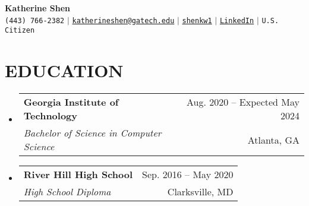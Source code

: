\documentclass[letterpaper,12pt]{extarticle}
\makeatletter
\newcommand{\resumeSubheading}[4]{
  \vspace{-1pt}\item
    \begin{tabular*}{\textwidth}[t]{l@{\extracolsep{\fill}}r}
      \textbf{#1} & {\color{dark-grey}\small #2}\vspace{1pt}\\ %
      \textit{#3} & {\color{dark-grey} \small #4}\\ %
    \end{tabular*}\vspace{-4pt}
}
\newcommand{\resumeSubHeadingListStart}{\begin{itemize}[leftmargin=0in, label={}]}
\newcommand{\resumeSubHeadingListEnd}{\end{itemize}}
\makeatother
\begin{document}
\begin{center}
    \textbf{\Huge Katherine Shen} \\ \vspace{5pt}
    \small \faPhone* \texttt{(443) 766-2382} \hspace{1pt} $|$
    \hspace{1pt} \faEnvelope \hspace{2pt} \texttt{\href{mailto:katherineshen@gatech.edu}{katherineshen@gatech.edu}} \hspace{1pt} $|$ 
    \hspace{1pt} \faGithub \hspace{2pt} \texttt{\href{https://github.com/shenkw1}{shenkw1}} \hspace{1pt} $|$
    \hspace{1pt} \faLinkedin \hspace{2pt} \texttt{\href{https://linkedin.com/in/katherinewshen/}{LinkedIn}} \hspace{1pt} $|$ 
    \hspace{1pt} \texttt{U.S. Citizen}
    \\ \vspace{-3pt}
\end{center}

\vspace{-5mm}
\section {EDUCATION}
  \resumeSubHeadingListStart
    \resumeSubheading
    {Georgia Institute of Technology}{Aug. 2020 -- Expected May 2024}
    {Bachelor of Science in Computer Science}{Atlanta, GA}

    \vspace{-3mm}
  \resumeSubheading
    {River Hill High School}{Sep. 2016 -- May 2020}
    {High School Diploma}{Clarksville, MD}
  \resumeSubHeadingListEnd
\end{document}
